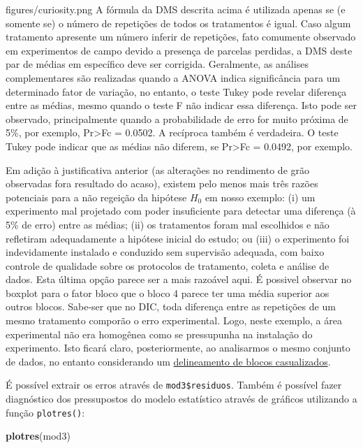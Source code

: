 \documentclass[
]{book}
\makeatletter
\newenvironment{Shaded}{\begin{snugshade}}{\end{snugshade}}
\newcommand{\KeywordTok}[1]{\textcolor[rgb]{0.13,0.29,0.53}{\textbf{#1}}}
\newcommand{\NormalTok}[1]{#1}
\numberwithin{equation}{section}
\newcommand{\indf}[1]{\index[function]{#1@\texttt{#1()}|ST}}
\newcommand{\indt}[1]{\index{#1|ST}}
\newenvironment{vcsabia}
  {\begin{customBlockImage}[colframe=customGreen, title=Curiosidade]{figures/curiosity.png}}
  {\end{customBlockImage}}
\makeatother
\begin{document}
\indt{Curiosidade}
\begin{vcsabia}
A fórmula da DMS descrita acima é utilizada apenas se (e somente se) o número de repetições de todos os tratamentos é igual. Caso algum tratamento apresente um número inferir de repetições, fato comumente observado em experimentos de campo devido a presença de parcelas perdidas, a DMS deste par de médias em específico deve ser corrigida. Geralmente, as análises complementares são realizadas quando a ANOVA indica significância para um determinado fator de variação, no entanto, o teste Tukey pode revelar diferença entre as médias, mesmo quando o teste F não indicar essa diferença. Isto pode ser observado, principalmente quando a probabilidade de erro for muito próxima de 5\%, por exemplo, Pr\textgreater Fc = 0.0502. A recíproca também é verdadeira. O teste Tukey pode indicar que as médias não diferem, se Pr\textgreater Fc = 0.0492, por exemplo.
\end{vcsabia}

Em adição à justificativa anterior (as alterações no rendimento de grão observadas fora resultado do acaso), existem pelo menos mais três razões potenciais para a não regeição da hipótese \(H_0\) em nosso exemplo: (i) um experimento mal projetado com poder insuficiente para detectar uma diferença (à 5\% de erro) entre as médias; (ii) os tratamentos foram mal escolhidos e não refletiram adequadamente a hipótese inicial do estudo; ou (iii) o experimento foi indevidamente instalado e conduzido sem supervisão adequada, com baixo controle de qualidade sobre os protocolos de tratamento, coleta e análise de dados. Esta última opção parece ser a mais razoável aqui. É possivel observar no boxplot para o fator bloco que o bloco 4 parece ter uma média superior aos outros blocos. Sabe-ser que no DIC, toda diferença entre as repetições de um mesmo tratamento comporão o erro experimental. Logo, neste exemplo, a área experimental não era homogênea como se pressupunha na instalação do experimento. Isto ficará claro, posteriormente, ao analisarmos o mesmo conjunto de dados, no entanto considerando um \hypertarget{DICQUALI}{\hyperlink{DBCQUALI}{delineamento de blocos casualizados}}.

É possível extrair os erros através de \texttt{mod3\$residuos}. Também é possível fazer diagnóstico dos pressupostos do modelo estatístico através de gráficos utilizando a função \texttt{plotres()}: \indf{plotres}

\begin{Shaded}
\begin{Highlighting}[]
\KeywordTok{plotres}\NormalTok{(mod3)}
\end{Highlighting}
\end{Shaded}
\end{document}
